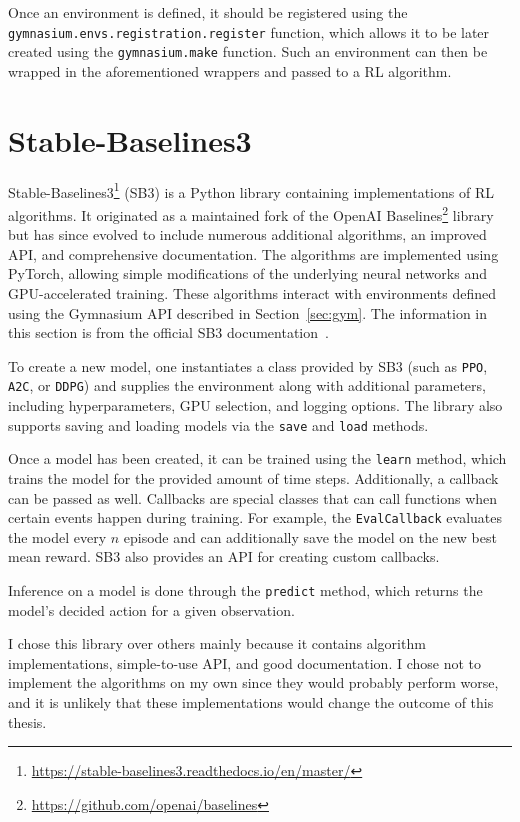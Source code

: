 \documentclass[
  digital,     %
  oneside,     %
  nosansbold,  %
  nocolorbold, %
  lof,         %
  lot,         %
]{fithesis4}
\begin{document}
Once an environment is defined, it should be registered using the \texttt{gymnasium.envs.registration.register} function, which allows it to be later created using the \texttt{gymnasium.make} function. Such an environment can then be wrapped in the aforementioned wrappers and passed to a RL algorithm.

\section{Stable-Baselines3}
Stable-Baselines3\footnote{\url{https://stable-baselines3.readthedocs.io/en/master/}} (SB3) is a Python library containing implementations of RL algorithms. It originated as a maintained fork of the OpenAI Baselines\footnote{\url{https://github.com/openai/baselines}} library but has since evolved to include numerous additional algorithms, an improved API, and comprehensive documentation. The algorithms are implemented using PyTorch, allowing simple modifications of the underlying neural networks and GPU-accelerated training. These algorithms interact with environments defined using the Gymnasium API described in Section~\ref{sec:gym}. The information in this section is from the official SB3 documentation~\cite{SB3-docs}.

To create a new model, one instantiates a class provided by SB3 (such as \texttt{PPO}, \texttt{A2C}, or \texttt{DDPG}) and supplies the environment along with additional parameters, including hyperparameters, GPU selection, and logging options. The library also supports saving and loading models via the \texttt{save} and \texttt{load} methods.

Once a model has been created, it can be trained using the \texttt{learn} method, which trains the model for the provided amount of time steps. Additionally, a callback can be passed as well. Callbacks are special classes that can call functions when certain events happen during training. For example, the \texttt{EvalCallback} evaluates the model every $n$ episode and can additionally save the model on the new best mean reward. SB3 also provides an API for creating custom callbacks.

Inference on a model is done through the \texttt{predict} method, which returns the model's decided action for a given observation.

I chose this library over others mainly because it contains algorithm implementations, simple-to-use API, and good documentation. I chose not to implement the algorithms on my own since they would probably perform worse, and it is unlikely that these implementations would change the outcome of this thesis.
\end{document}
